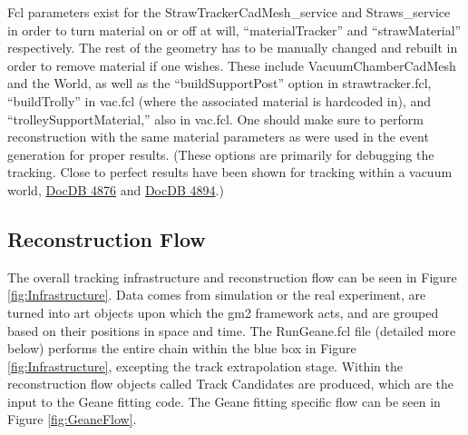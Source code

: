 \documentclass{article}
\begin{document}
    Fcl parameters exist for the StrawTrackerCadMesh\_service and Straws\_service in order to turn material on or off at will, ``materialTracker'' and ``strawMaterial'' respectively. The rest of the geometry has to be manually changed and rebuilt in order to remove material if one wishes. These include VacuumChamberCadMesh and the World, as well as the ``buildSupportPost'' option in strawtracker.fcl, ``buildTrolly'' in vac.fcl (where the associated material is hardcoded in), and ``trolleySupportMaterial,'' also in vac.fcl. One should make sure to perform reconstruction with the same material parameters as were used in the event generation for proper results. (These options are primarily for debugging the tracking. Close to perfect results have been shown for tracking within a vacuum world, \href{http://gm2-docdb.fnal.gov:8080/cgi-bin/ShowDocument?docid=4876}{DocDB 4876} and \href{http://gm2-docdb.fnal.gov:8080/cgi-bin/ShowDocument?docid=4894}{DocDB 4894}.)


    \subsection{Reconstruction Flow}

    The overall tracking infrastructure and reconstruction flow can be seen in Figure \ref{fig:Infrastructure}. Data comes from simulation or the real experiment, are turned into art objects upon which the gm2 framework acts, and are grouped based on their positions in space and time. The RunGeane.fcl file (detailed more below) performs the entire chain within the blue box in Figure \ref{fig:Infrastructure}, excepting the track extrapolation stage. Within the reconstruction flow objects called Track Candidates are produced, which are the input to the Geane fitting code. The Geane fitting specific flow can be seen in Figure \ref{fig:GeaneFlow}. 
\end{document}

